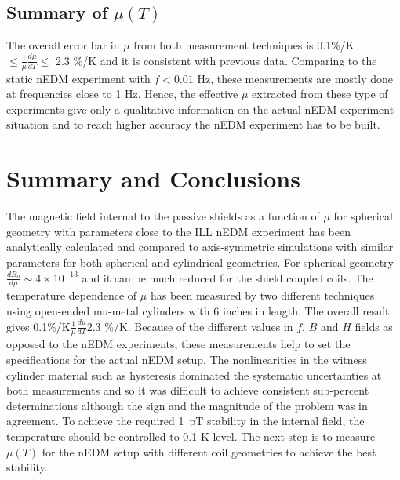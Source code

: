 \documentclass[review]{elsarticle}
\begin{document}


\subsection{Summary of $\mu(T)$}
The overall error bar in $\mu$ from both measurement techniques is 0.1\%/K $\leq \frac{1}{\mu}\frac{d\mu}{dT} \leq$ 2.3 \%/K and it is consistent with previous data.
Comparing to the static nEDM experiment with $f < 0.01$ Hz, these measurements are mostly done at frequencies close to 1 Hz. Hence, the effective $\mu$ extracted from these type of experiments give
only a qualitative information on the actual nEDM experiment situation and to reach higher accuracy the nEDM experiment has to be built. 
\section{Summary and Conclusions}
The magnetic field internal to the passive shields as a function of $\mu$ for spherical geometry with parameters close to the ILL nEDM experiment has been analytically calculated and compared to axis-symmetric simulations with similar parameters for both spherical and cylindrical geometries. For spherical geometry $\frac{dB_0}{d\mu}\sim 4 \times 10^{-13}$ and it can be much reduced for the shield coupled coils.
The temperature dependence of $\mu$ has been measured by two different techniques using open-ended mu-metal cylinders with 6 inches in length. The overall result gives 0.1\%/K$\frac{1}{\mu}\frac{d\mu}{dT}$2.3 \%/K. Because of the different values in $f$, $B$ and $H$ fields as opposed to the nEDM experiments, these  measurements help to set the specifications for the actual nEDM setup. The nonlinearities in the witness cylinder material such as hysteresis dominated the systematic uncertainties at both measurements and so it was difficult to achieve consistent sub-percent determinations although the sign and the magnitude of the problem was in agreement.
To achieve the required 1~pT stability in the internal field, the temperature should be controlled to 0.1 K level.
The next step is to measure $\mu(T)$ for the nEDM setup with different coil geometries to achieve the best stability.
\end{document}
